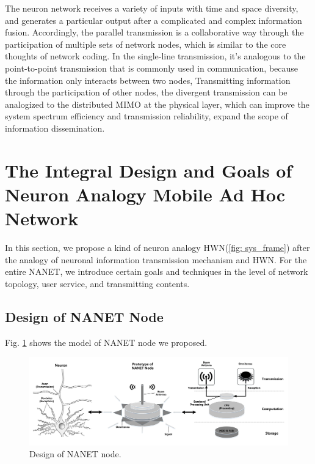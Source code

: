 \documentclass[journal,comsoc]{IEEEtran}
\begin{document}
			The neuron network receives a variety of inputs with time and space diversity, and  generates a particular output after a complicated and complex information fusion.
			Accordingly, the parallel transmission is a collaborative way through the participation of multiple sets of network nodes, which is similar to the core thoughts of network coding.
			In the single-line transmission,  it's analogous to the point-to-point transmission that is commonly used in communication, because the information only interacts between two nodes,
			Transmitting information through the participation of other nodes, the divergent transmission can be analogized to the distributed MIMO at the physical layer, which can improve the system spectrum efficiency and transmission reliability, expand the scope of information dissemination.
	
	\section{The Integral Design and Goals of Neuron Analogy Mobile Ad Hoc Network}
	\label{section: general_design}
		In this section, we propose a kind of neuron analogy HWN(\ref{fig: sys_frame})  after the analogy of neuronal information transmission mechanism and HWN.
		For the entire NANET, we introduce certain goals and techniques in the level of network topology, user service, and transmitting contents.
		
		\subsection{Design of NANET Node}
				Fig. \ref{fig: NANET_node} shows the model of NANET node we proposed.
				\begin{figure}[htbp]
					\centering
					\includegraphics[width=0.95\linewidth]{figures/node_model.pdf}
					\caption{Design of NANET node.}	
					\label{fig: NANET_node}
				\end{figure}
		
\end{document}
